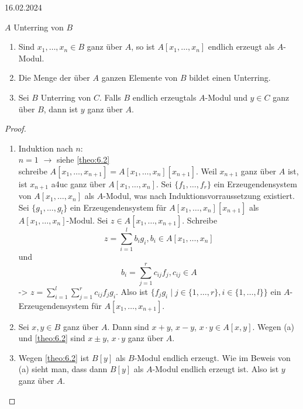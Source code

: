 \documentclass[../main.tex]{subfiles}
\begin{document}
\begin{flushright}
    16.02.2024
\end{flushright}
\begin{corollary}
    $A$ Unterring von $B$
    \begin{enumerate}[label=(\alph*)]
        \item Sind $x_1, \dots, x_n\in B$ ganz über $A$, so ist $A[x_1,\dots,x_n]$ endlich erzeugt als $A$-Modul.
        \item Die Menge der über $A$ ganzen Elemente von $B$ bildet einen Unterring.
        \item Sei $B$ Unterring von $C$. Falls $B$ endlich erzeugtals $A$-Modul und $y\in C$ ganz über $B$, dann ist $y$ ganz über $A$.
    \end{enumerate}
\end{corollary}
\begin{proof}
    \begin{enumerate}[label=(\alph*)]
        \item Induktion nach $n$:\\
        $n=1$ $\rightarrow$ siehe \ref{theo:6.2}\\
        schreibe $A[x_1, \dots,x_{n+1}] = A[x_1,\dots,x_{n}][x_{n+1}]$.
        Weil $x_{n+1}$ ganz über $A$ ist, ist $x_{n+1}$ a4uc ganz über $A[x_1,\dots,x_n]$.
        Sei $\{f_1,\dots, f_r\}$ ein Erzeugendensystem von $A[x_1,\dots,x_n]$ als $A$-Modul, was nach Induktionsvorraussetzung existiert.
        Sei $\{g_1,\dots,g_l\}$ ein Erzeugendensystem für $A[x_1,\dots, x_n][x_{n+1}]$ als $A[x_1,\dots,x_n]$-Modul.
        Sei $z\in A[x_1,\dots,x_{n+1}]$. Schreibe $$z=\sum_{i=1}^l b_ig_i, b_i\in A[x_1,\dots,x_n]$$
        und $$b_i = \sum_{j=1}^r c_{ij} f_j, c_{ij}\in A$$
        -> $z=\sum_{i=1}^l\sum_{j=1}^r c_{ij} f_j g_i$. Also ist $\{f_j g_i\mid j\in \{1,\dots,r\}, i\in \{1,\dots,l\}\}$ ein $A$-Erzeugendensystem für $A[x_1,\dots,x_{n+1}]$.
        \item
        Sei $x,y\in B$ ganz über $A$.
        Dann sind $x+y$, $x-y$, $x\cdot y \in A[x,y]$.
        Wegen (a) und \ref{theo:6.2} sind $x\pm y$, $x\cdot y$ ganz über $A$.
        \item
        Wegen \ref{theo:6.2} ist $B[y]$ als $B$-Modul endlich erzeugt. Wie im Beweis von (a) sieht man, dass dann $B[y]$ als $A$-Modul endlich erzeugt ist. Also ist $y$ ganz über $A$.
    \end{enumerate}
\end{proof}
\end{document}
